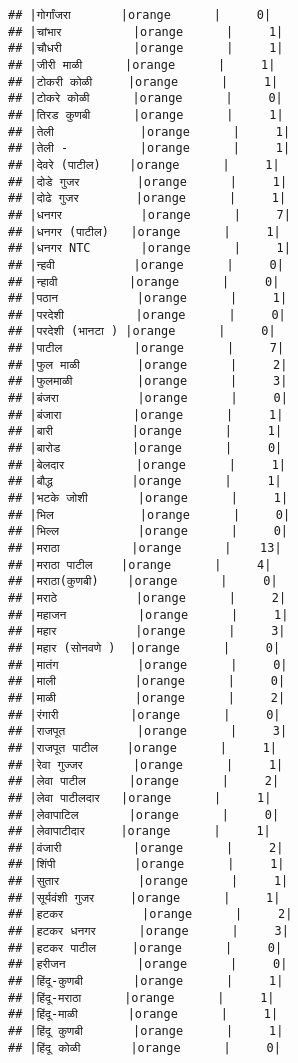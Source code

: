 \documentclass[
]{article}
\begin{document}
\begin{verbatim}
## |गोर्गांजरा       |orange      |     0|
## |चांभार          |orange      |     1|
## |चौधरी          |orange      |     1|
## |जीरी माळी      |orange      |     1|
## |टोकरी कोळी     |orange      |     1|
## |टोकरे कोळी      |orange      |     0|
## |तिरड कुणबी      |orange      |     1|
## |तेली            |orange      |     1|
## |तेली -          |orange      |     1|
## |देवरे (पाटील)    |orange      |     1|
## |दोडे गुजर        |orange      |     1|
## |दोढे गुजर        |orange      |     1|
## |धनगर           |orange      |     7|
## |धनगर (पाटील)   |orange      |     1|
## |धनगर NTC       |orange      |     1|
## |न्हवी           |orange      |     0|
## |न्हावी          |orange      |     0|
## |पठान           |orange      |     1|
## |परदेशी          |orange      |     0|
## |परदेशी (भानटा ) |orange      |     0|
## |पाटील          |orange      |     7|
## |फुल माळी        |orange      |     2|
## |फुलमाळी         |orange      |     3|
## |बंजरा           |orange      |     0|
## |बंजारा          |orange      |     1|
## |बारी           |orange      |     1|
## |बारोड          |orange      |     0|
## |बेलदार          |orange      |     1|
## |बौद्ध           |orange      |     1|
## |भटके जोशी       |orange      |     1|
## |भिल            |orange      |     0|
## |भिल्ल           |orange      |     0|
## |मराठा          |orange      |    13|
## |मराठा पाटील    |orange      |     4|
## |मराठा(कुणबी)    |orange      |     0|
## |मराठे           |orange      |     2|
## |महाजन          |orange      |     1|
## |महार           |orange      |     3|
## |महार (सोनवणे )  |orange      |     0|
## |मातंग           |orange      |     0|
## |माली           |orange      |     0|
## |माळी           |orange      |     2|
## |रंगारी          |orange      |     0|
## |राजपूत          |orange      |     3|
## |राजपूत पाटील    |orange      |     1|
## |रेवा गुज्जर       |orange      |     1|
## |लेवा पाटील      |orange      |     2|
## |लेवा पाटीलदार   |orange      |     1|
## |लेवापाटिल       |orange      |     0|
## |लेवापाटीदार     |orange      |     1|
## |वंजारी          |orange      |     2|
## |शिंपी           |orange      |     1|
## |सुतार           |orange      |     1|
## |सूर्यवंशी गुजर     |orange      |     1|
## |हटकर           |orange      |     2|
## |हटकर धनगर      |orange      |     3|
## |हटकर पाटील     |orange      |     0|
## |हरीजन          |orange      |     0|
## |हिंदू-कुणबी       |orange      |     1|
## |हिंदू-मराठा      |orange      |     1|
## |हिंदू-माळी       |orange      |     1|
## |हिंदू कुणबी       |orange      |     1|
## |हिंदू कोळी       |orange      |     0|

\end{verbatim}
\end{document}
